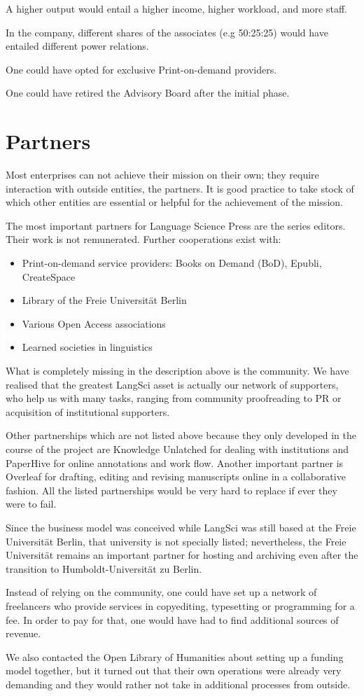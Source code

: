 \documentclass[nonflat,smallfont
]{langsci/langscibook}
\newcommand{\background}[1]{ 
  \vspace{5mm}
  \renewcommand{\tblslinecolour}{lsDarkBlue}
  \tblssy[red]{explore2}{Background}{\vspace*{-5mm}#1}
}
\newcommand{\langscisolution}[1]{
  \renewcommand{\tblslinecolour}{lsLightBlue}
  \tblssy{langsci}{LangSci solution}{\vspace*{-5mm}#1}
}
\newcommand{\evaluation}[1]{
  \renewcommand{\tblslinecolour}{lsLightOrange}
  \tblssy{receipt}{Evaluation}{\vspace*{-5mm}#1}
}
\newcommand{\othersolutions}[1]{
  \renewcommand{\tblslinecolour}{lsDarkGreenOne}
  \tblssy{more}{Other solutions}{\vspace*{-5mm}#1}
}
\renewcommand{\tblssy}[4][black!12]{%
  \renewcommand{\langscisymbol}{#2}\renewcommand{\tblsboxcolor}{#1}
  \begin{mdframed}[style=yellowexercise,frametitle={#3}]
    #4
  \end{mdframed}
}
\begin{document}
\othersolutions{A higher output would entail a higher income, higher workload, and more staff. 

In the company, different shares of the associates (e.g 50:25:25) would have entailed different power relations.

One could have opted for exclusive Print-on-demand providers. 

One could have retired the Advisory Board after the initial phase.  
}
 
\newpage  
\section{Partners}
\vspace*{5mm}
\background{Most enterprises can not achieve their mission on their own; they require interaction with outside entities, the partners. It is good practice to take stock of which other entities are essential or helpful for the achievement of the mission.}
\langscisolution{
The most important partners for Language Science Press are the series editors. Their work is not remunerated. Further cooperations exist with:
\begin{itemize}
 \item Print-on-demand service providers: Books on Demand (BoD), Epubli, CreateSpace 
 \item Library of the Freie Universität Berlin
 \item Various Open Access associations 
 \item Learned societies in linguistics
\end{itemize}
}
\evaluation{
What is completely missing in the description above is the community. We have realised that the greatest LangSci asset is actually our network of supporters, who help us with many tasks, ranging from community proofreading to PR or acquisition of institutional supporters. 

Other partnerships which are not listed above because they only developed in the course of the project are Knowledge Unlatched for dealing with institutions and PaperHive for online annotations and work flow. Another important partner is Overleaf for drafting, editing and revising manuscripts online in a collaborative fashion. All the listed partnerships would be very hard to replace if ever they were to fail.

Since the business model was conceived while LangSci was still based at the Freie Universität Berlin, that university is not specially listed; nevertheless, the Freie Universität remains an important partner for hosting and archiving even after the transition to Humboldt-Universität zu Berlin.
}
\othersolutions{ 
Instead of relying on the community, one could have set up a network of freelancers who provide services in copyediting, typesetting or programming for a fee. In order to pay for that, one would have had to find additional sources of revenue. 

We also contacted the Open Library of Humanities about setting up a funding model together, but it turned out that their own operations were already very demanding and they would rather not take in additional processes from outside. 
}
 
\end{document}
